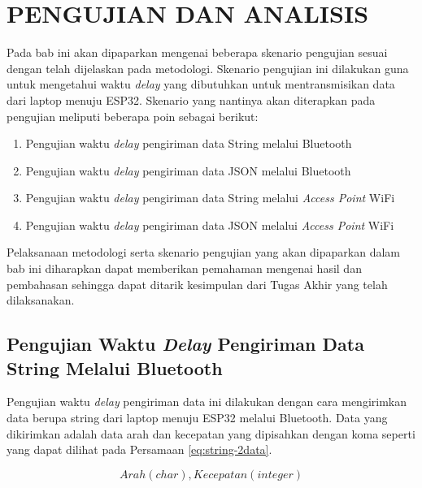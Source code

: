   \chapter{PENGUJIAN DAN ANALISIS}
\label{chap:pengujiananalisis}


Pada bab ini akan dipaparkan mengenai beberapa skenario pengujian sesuai dengan telah dijelaskan pada metodologi. Skenario pengujian ini dilakukan guna untuk mengetahui waktu \emph{delay} yang dibutuhkan untuk mentransmisikan data dari laptop menuju ESP32. Skenario yang nantinya akan diterapkan pada pengujian meliputi beberapa poin sebagai berikut:

\begin{enumerate}[nosep]
  \item Pengujian waktu \emph{delay} pengiriman data String melalui Bluetooth
  \item Pengujian waktu \emph{delay} pengiriman data JSON melalui Bluetooth
  \item Pengujian waktu \emph{delay} pengiriman data String melalui \emph{Access Point} WiFi
  \item Pengujian waktu \emph{delay} pengiriman data JSON melalui \emph{Access Point} WiFi
\end{enumerate}

Pelaksanaan metodologi serta skenario pengujian yang akan dipaparkan dalam bab ini diharapkan dapat memberikan pemahaman mengenai hasil dan pembahasan sehingga dapat ditarik kesimpulan dari Tugas Akhir yang telah dilaksanakan.


\section{Pengujian Waktu \emph{Delay} Pengiriman Data String Melalui Bluetooth}
\label{sec:delayBluetooth}

Pengujian waktu \emph{delay} pengiriman data ini dilakukan dengan cara mengirimkan data berupa string dari laptop menuju ESP32 melalui Bluetooth. Data yang dikirimkan adalah data arah dan kecepatan yang dipisahkan dengan koma seperti yang dapat dilihat pada Persamaan \ref{eq:string-2data}.

\begin{equation}
  \label{eq:string-2data}
    Arah(char),Kecepatan(integer)
\end{equation}

